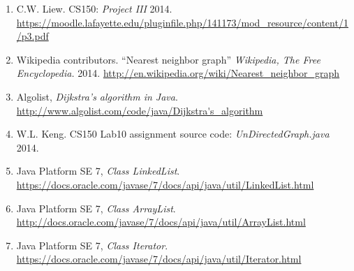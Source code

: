 \documentclass[12pt]{article}  %
\begin{document}
\begin{enumerate}

\item C.W. Liew. CS150: \emph{Project III} 2014. \url{https://moodle.lafayette.edu/pluginfile.php/141173/mod_resource/content/1/p3.pdf}\label{Problem}

\item Wikipedia contributors. ``Nearest neighbor graph'' \emph{Wikipedia, The Free Encyclopedia.} 2014. \url{http://en.wikipedia.org/wiki/Nearest_neighbor_graph}\label{NNG}

\item Algolist, \emph{Dijkstra's algorithm in Java}. \url{http://www.algolist.com/code/java/Dijkstra's_algorithm}\label{Dijkstra}

\item W.L. Keng. CS150 Lab10 assignment source code: \emph{UnDirectedGraph.java} 2014.


\item Java Platform SE 7, \emph{Class LinkedList}. \url{https://docs.oracle.com/javase/7/docs/api/java/util/LinkedList.html}

\item Java Platform SE 7, \emph{Class ArrayList}. \url{http://docs.oracle.com/javase/7/docs/api/java/util/ArrayList.html}

\item Java Platform SE 7, \emph{Class Iterator}. \url{https://docs.oracle.com/javase/7/docs/api/java/util/Iterator.html}


\end{enumerate}
\end{document}
